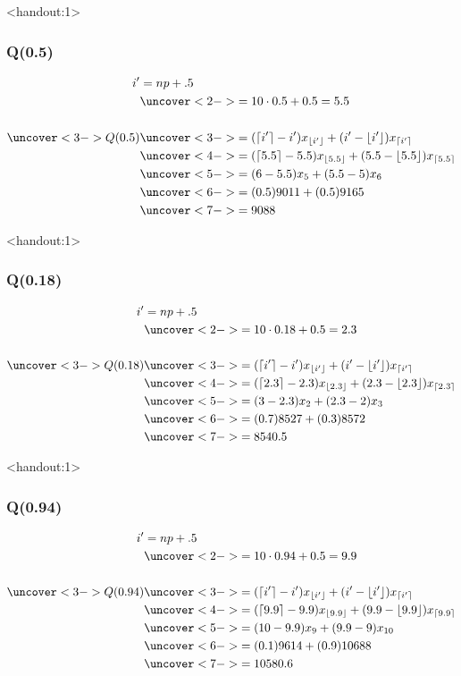 \documentclass[handout]{beamer}\usepackage{graphicx, color}
\newcommand{\answers}{1}
\numberwithin{equation}{section}
\begin{document}
\begin{frame}<handout:\answers>
\frametitle{Q(0.5)}
\begin{align*}
i' &= np + .5 \\
& \uncover<2->{=10 \cdot 0.5 + 0.5 = 5.5}\\ \\
\uncover<3->{Q(0.5)} &   \uncover<3->{=(\lceil i' \rceil -i')x_{\lfloor i' \rfloor} + (i'-\lfloor i' \rfloor)x_{\lceil i' \rceil}} \\
&\uncover<4->{= (\lceil 5.5 \rceil - 5.5)x_{\lfloor 5.5 \rfloor} + (5.5 - \lfloor 5.5 \rfloor)x_{\lceil 5.5 \rceil}} \\
&\uncover<5->{= (6 - 5.5) x_5 + (5.5 - 5) x_6} \\
&\uncover<6->{= (0.5) 9011 + (0.5) 9165} \\
&\uncover<7->{= 9088}
\end{align*}
\end{frame}

\begin{frame}<handout:\answers>
\frametitle{Q(0.18)}
\begin{align*}
i' &= np + .5 \\
&\uncover<2->{=10 \cdot 0.18 + 0.5 = 2.3} \\ \\
\uncover<3->{Q(0.18)} &\uncover<3->{=   (\lceil i' \rceil -i')x_{\lfloor i' \rfloor} + (i'-\lfloor i' \rfloor)x_{\lceil i' \rceil} }\\
&\uncover<4->{=(\lceil 2.3 \rceil - 2.3)x_{\lfloor 2.3 \rfloor} + (2.3 - \lfloor 2.3 \rfloor)x_{\lceil 2.3 \rceil}} \\
& \uncover<5->{= (3 - 2.3) x_2 + (2.3 - 2) x_3} \\
& \uncover<6->{= (0.7) 8527 + (0.3) 8572} \\
&\uncover<7->{= 8540.5}
\end{align*}
\end{frame}

\begin{frame}<handout:\answers>
\frametitle{Q(0.94)}
\begin{align*}
i' &= np + .5 \\
&\uncover<2->{=10 \cdot 0.94 + 0.5 = 9.9 }\\ \\
\uncover<3->{Q(0.94)} &\uncover<3->{=   (\lceil i' \rceil -i')x_{\lfloor i' \rfloor} + (i'-\lfloor i' \rfloor)x_{\lceil i' \rceil}} \\
&\uncover<4->{=(\lceil 9.9 \rceil - 9.9)x_{\lfloor 9.9 \rfloor} + (9.9 - \lfloor 9.9 \rfloor)x_{\lceil 9.9 \rceil}} \\
&\uncover<5->{ = (10 - 9.9) x_9 + (9.9 - 9) x_{10}} \\
&\uncover<6->{ = (0.1) 9614+ (0.9)10688 } \\
&\uncover<7->{= 10580.6}
\end{align*}
\end{frame}
\end{document}
